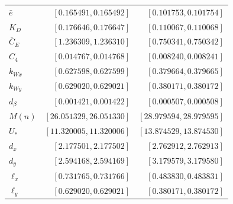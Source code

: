 \begin{table}[!htbp]
\begin{tabular}{@{}lrr@{}}
$\bar e$ & $[0.165491,0.165492]$ & $[0.101753,0.101754]$\\
$K_D$ & $[0.176646,0.176647]$ & $[0.110067,0.110068]$\\
$\overline C_E$ & $[1.236309,1.236310]$ & $[0.750341,0.750342]$\\
$C_4$ & $[0.014767,0.014768]$ & $[0.008240,0.008241]$\\
$k_{Wx}$ & $[0.627598,0.627599]$ & $[0.379664,0.379665]$\\
$k_{Wy}$ & $[0.629020,0.629021]$ & $[0.380171,0.380172]$\\
$d_\beta$ & $[0.001421,0.001422]$ & $[0.000507,0.000508]$\\
$M(n)$ & $[26.051329,26.051330]$ & $[28.979594,28.979595]$\\
$U_*$ & $[11.320005,11.320006]$ & $[13.874529,13.874530]$\\
$d_x$ & $[2.177501,2.177502]$ & $[2.762912,2.762913]$\\
$d_y$ & $[2.594168,2.594169]$ & $[3.179579,3.179580]$\\
$\ell_x$ & $[0.731765,0.731766]$ & $[0.483830,0.483831]$\\
$\ell_y$ & $[0.629020,0.629021]$ & $[0.380171,0.380172]$\\
\bottomrule\end{tabular}
\end{table}
\clearpage
